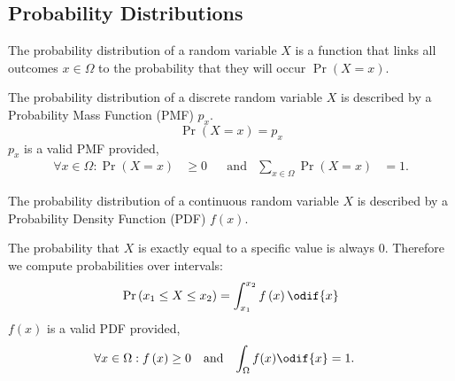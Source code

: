 \documentclass{article}
\begin{document}
\subsection{Probability Distributions}
\begin{definition}
    The probability distribution of a random variable \(X\) is a function that links all outcomes \(x \in \Omega\)
    to the probability that they will occur \(\Pr{\left( X = x \right)}\).
\end{definition}
\begin{definition}
    The probability distribution of a discrete random variable \(X\) is described by a Probability
    Mass Function (PMF) \(p_x\).
    \begin{equation*}
        \Pr{\left( X = x \right)} = p_x
    \end{equation*}
    \(p_x\) is a valid PMF provided,
    \begin{align*}
        \forall x \in \Omega : \Pr{\left( X = x \right)} & \geq 0 &  & \text{and} & \sum_{x \in \Omega} \Pr{\left( X = x \right)} & = 1.
    \end{align*}
\end{definition}
\begin{definition}
    The probability distribution of a continuous random variable \(X\) is described by a Probability
    Density Function (PDF) \(f\left( x \right)\).

    The probability that \(X\) is exactly equal to a
    specific value is always 0. Therefore we compute probabilities over intervals:
    \begin{equation*}
        \Pr{\left( x_1 \leq X \leq x_2 \right)} = \int_{x_1}^{x_2} f\left( x \right) \odif{x}
    \end{equation*}
    \(f\left( x \right)\) is a valid PDF provided,
    \begin{align*}
        \forall x \in \Omega : f\left( x \right) & \geq 0 &  & \text{and} & \int_{\Omega} f(x) \odif{x} & = 1.
    \end{align*}
\end{definition}
\end{document}
